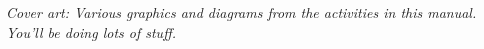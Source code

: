 \vfill


\textit{Cover art: Various graphics and diagrams from the activities in this manual.  You'll be doing lots of stuff.}

\pagebreak
